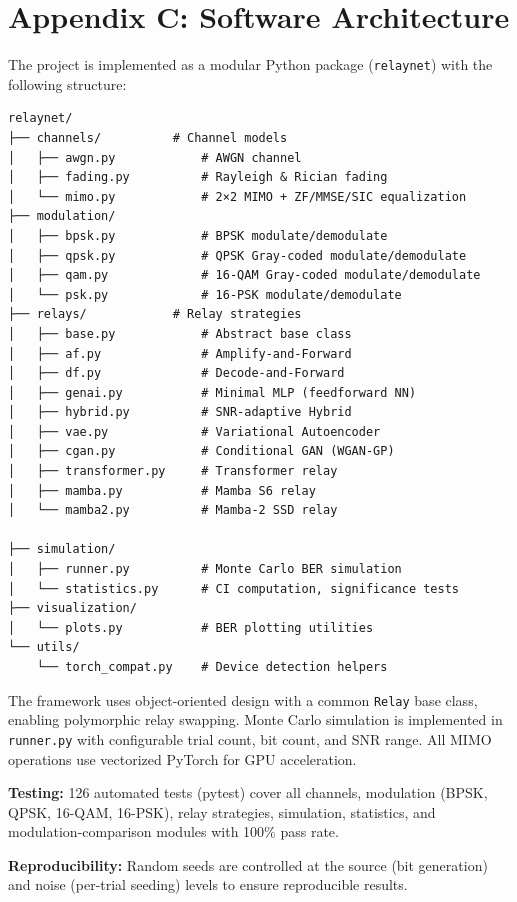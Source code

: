\documentclass[
  english,
  12pt,
  12pt,
  a4paper,
  oneside]{report}
\begin{document}
\section{Appendix C: Software Architecture}\label{sec:appendix-c-software-architecture}

The project is implemented as a modular Python package (\texttt{relaynet}) with the following structure:

\begin{verbatim}
relaynet/
├── channels/          # Channel models
│   ├── awgn.py            # AWGN channel
│   ├── fading.py          # Rayleigh & Rician fading
│   └── mimo.py            # 2×2 MIMO + ZF/MMSE/SIC equalization
├── modulation/
│   ├── bpsk.py            # BPSK modulate/demodulate
│   ├── qpsk.py            # QPSK Gray-coded modulate/demodulate
│   ├── qam.py             # 16-QAM Gray-coded modulate/demodulate
│   └── psk.py             # 16-PSK modulate/demodulate
├── relays/            # Relay strategies
│   ├── base.py            # Abstract base class
│   ├── af.py              # Amplify-and-Forward
│   ├── df.py              # Decode-and-Forward
│   ├── genai.py           # Minimal MLP (feedforward NN)
│   ├── hybrid.py          # SNR-adaptive Hybrid
│   ├── vae.py             # Variational Autoencoder
│   ├── cgan.py            # Conditional GAN (WGAN-GP)
│   ├── transformer.py     # Transformer relay
│   ├── mamba.py           # Mamba S6 relay
│   └── mamba2.py          # Mamba-2 SSD relay

├── simulation/
│   ├── runner.py          # Monte Carlo BER simulation
│   └── statistics.py      # CI computation, significance tests
├── visualization/
│   └── plots.py           # BER plotting utilities
└── utils/
    └── torch_compat.py    # Device detection helpers
\end{verbatim}

The framework uses object-oriented design with a common \texttt{Relay} base class, enabling polymorphic relay swapping. Monte Carlo simulation is implemented in \texttt{runner.py} with configurable trial count, bit count, and SNR range. All MIMO operations use vectorized PyTorch for GPU acceleration.

\textbf{Testing:} 126 automated tests (pytest) cover all channels, modulation (BPSK, QPSK, 16-QAM, 16-PSK), relay strategies, simulation, statistics, and modulation-comparison modules with 100\% pass rate.

\textbf{Reproducibility:} Random seeds are controlled at the source (bit generation) and noise (per-trial seeding) levels to ensure reproducible results.
\end{document}
